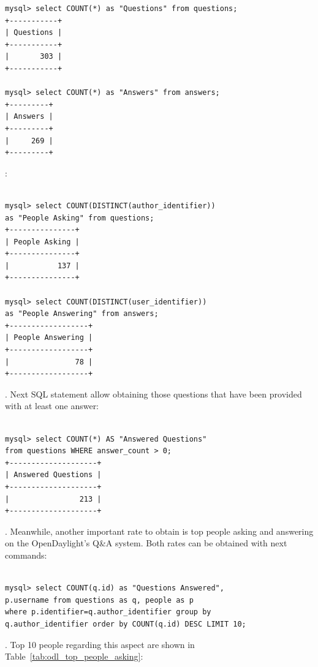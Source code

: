 \documentclass[a4paper, 12pt]{book}
\begin{document}
{\begin{verbatim}
mysql> select COUNT(*) as "Questions" from questions;
+-----------+
| Questions |
+-----------+
|       303 |
+-----------+

mysql> select COUNT(*) as "Answers" from answers;
+---------+
| Answers |
+---------+
|     269 |
+---------+

\end{verbatim}

:
\begin{verbatim}

mysql> select COUNT(DISTINCT(author_identifier))
as "People Asking" from questions;
+---------------+
| People Asking |
+---------------+
|           137 |
+---------------+

mysql> select COUNT(DISTINCT(user_identifier))
as "People Answering" from answers;
+------------------+
| People Answering |
+------------------+
|               78 |
+------------------+

\end{verbatim}

. Next SQL statement allow obtaining those questions that have been provided with at least one answer:

\begin{verbatim}

mysql> select COUNT(*) AS "Answered Questions"
from questions WHERE answer_count > 0;
+--------------------+
| Answered Questions |
+--------------------+
|                213 |
+--------------------+

\end{verbatim}

. Meanwhile, another important rate to obtain is top people asking and answering on the OpenDaylight's Q\&A system. Both rates can be obtained with next commands:

\begin{verbatim}

mysql> select COUNT(q.id) as "Questions Answered",
p.username from questions as q, people as p
where p.identifier=q.author_identifier group by
q.author_identifier order by COUNT(q.id) DESC LIMIT 10;

\end{verbatim}
. Top 10 people regarding this aspect are shown in Table~\ref{tab:odl_top_people_asking}:

}
\end{document}
